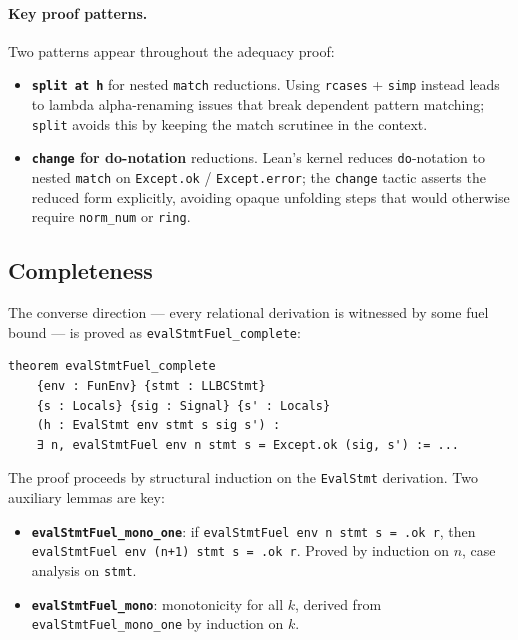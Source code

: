 \paragraph{Key proof patterns.}
Two patterns appear throughout the adequacy proof:

\begin{itemize}[leftmargin=2em]
  \item \textbf{\texttt{split at h}} for nested \texttt{match} reductions.
        Using \texttt{rcases} + \texttt{simp} instead leads to lambda
        alpha-renaming issues that break dependent pattern matching; \texttt{split}
        avoids this by keeping the match scrutinee in the context.

  \item \textbf{\texttt{change} for do-notation} reductions.
        Lean's kernel reduces \texttt{do}-notation to nested \texttt{match} on
        \texttt{Except.ok} / \texttt{Except.error}; the \texttt{change}
        tactic asserts the reduced form explicitly, avoiding opaque unfolding
        steps that would otherwise require \texttt{norm\_num} or \texttt{ring}.
\end{itemize}

\subsection{Completeness}

The converse direction — every relational derivation is witnessed by
some fuel bound — is proved as \texttt{evalStmtFuel\_complete}:

\begin{lstlisting}[caption={Completeness of the LLBC interpreter.},
                   label={lst:complete}]
theorem evalStmtFuel_complete
    {env : FunEnv} {stmt : LLBCStmt}
    {s : Locals} {sig : Signal} {s' : Locals}
    (h : EvalStmt env stmt s sig s') :
    ∃ n, evalStmtFuel env n stmt s = Except.ok (sig, s') := ...
\end{lstlisting}

\noindent
The proof proceeds by structural induction on the \texttt{EvalStmt} derivation.
Two auxiliary lemmas are key:

\begin{itemize}[leftmargin=2em]
  \item \textbf{\texttt{evalStmtFuel\_mono\_one}}: if
        \texttt{evalStmtFuel env n stmt s = .ok r}, then
        \texttt{evalStmtFuel env (n+1) stmt s = .ok r}.
        Proved by induction on $n$, case analysis on \texttt{stmt}.

  \item \textbf{\texttt{evalStmtFuel\_mono}}: monotonicity for all $k$,
        derived from \texttt{evalStmtFuel\_mono\_one} by induction on $k$.
\end{itemize}

